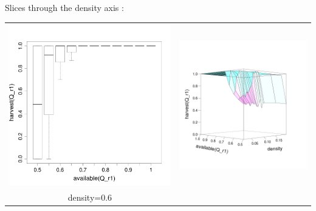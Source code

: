 \documentclass[8pt, handout=show,notes=show]{beamer}
\begin{document}
\begin{frame}{ Slices through the density axis : }
\begin{table}[H]
\begin{tabular}{cc}
			\includegraphics[width=\imgSize]{images/harvestr1_r1_density-60.png}&
			\includegraphics[width=\imgSize]{images/R1_median}\\
			density=0.6&\\
		\end{tabular}

	\end{table}

\end{frame}
\end{document}
